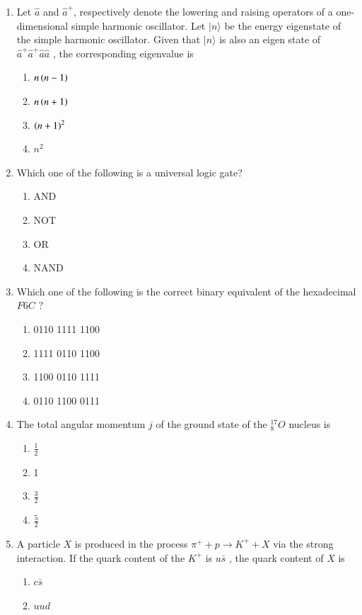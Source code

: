 \documentclass[journal,12pt,onecolumn,article]{IEEEtran}
\theoremstyle{remark}
\begin{document}
\begin{enumerate}
\begin{enumerate}
		\end{enumerate}
	\item Let $\hat{a}$ and $\hat{a}^{+}$, respectively denote the lowering and raising operators of a one-dimensional simple harmonic oscillator. Let $|n\rangle$ be the energy eigenstate of the simple harmonic oscillator. Given that $|n\rangle$ is also an eigen state of $\hat{a}^{+}\hat{a}^{+}\hat{a}\hat{a}$ , the corresponding eigenvalue is
		\begin{enumerate}
	\item $n\left(n-1\right)$
	\item $n\left(n+1\right)$
	\item $\left(n+1\right)^2$
	\item $n^2$
		\end{enumerate}
	\item Which one of the following is a universal logic gate?
		\begin{enumerate}
			\item AND
			\item NOT
			\item OR
			\item NAND
		\end{enumerate}
	\item Which one of the following is the correct binary equivalent of the hexadecimal $F6C$ ?
		\begin{enumerate}
			\item 0110 1111 1100 
			\item 1111 0110 1100
			\item 1100 0110 1111
			\item 0110 1100 0111
		\end{enumerate}
	\item The total angular momentum $j$ of the ground state of the $^{17}_{8}O$ nucleus is
		\begin{enumerate}
			\item $\frac{1}{2}$
			\item 1
			\item $\frac{3}{2}$
			\item $\frac{5}{2}$
		\end{enumerate}
	\item A particle $X$ is produced in the process $\pi ^{+}+p \to K^{+}+X$ via the strong interaction. If the quark content of the $K^{+}$ is $u\bar{s}$ , the quark content of $X$ is
		\begin{enumerate}
			\item $c\bar{s}$
			\item $uud$

\end{enumerate}
\end{enumerate}
\end{document}

